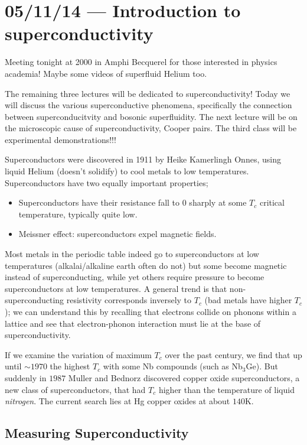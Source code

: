 \documentclass[10pt]{report}
\begin{document}
\chapter{05/11/14 --- Introduction to superconductivity}

Meeting tonight at 2000 in Amphi Becquerel for those interested in physics academia! Maybe some videos of superfluid Helium too.

The remaining three lectures will be dedicated to superconductivity! Today we will discuss the various superconductive phenomena, specifically the connection between superconducitvity and bosonic superfluidity. The next lecture will be on the microscopic cause of superconductivity, Cooper pairs. The third class will be experimental demonstrations!!!

Superconductors were discovered in 1911 by Heike Kamerlingh Onnes, using liquid Helium (doesn't solidify) to cool metals to low temperatures. Superconductors have two equally important properties;
\begin{itemize}
    \item Superconductors have their resistance fall to $0$ sharply at some $T_c$ critical temperature, typically quite low. 
    \item Meissner effect: superconductors expel magnetic fields.
\end{itemize}

Most metals in the periodic table indeed go to superconductors at low temperatures (alkalai/alkaline earth often do not) but some become magnetic instead of superconducting, while yet others require pressure to become superconductors at low temperatures. A general trend is that non-superconducting resistivity corresponds inversely to $T_c$ (bad metals have higher $T_c$); we can understand this by recalling that electrons collide on phonons within a lattice and see that electron-phonon interaction must lie at the base of superconductivity. 

If we examine the variation of maximum $T_c$ over the past century, we find that up until $\sim1970$ the highest $T_c$ with some Nb compounds (such as Nb$_3$Ge). But suddenly in $1987$ Muller and Bednorz discovered copper oxide superconductors, a new class of superconductors, that had $T_c$ higher than the temperature of liquid \emph{nitrogen}. The current search lies at Hg copper oxides at about $140$K. 

\section{Measuring Superconductivity}
\end{document}
